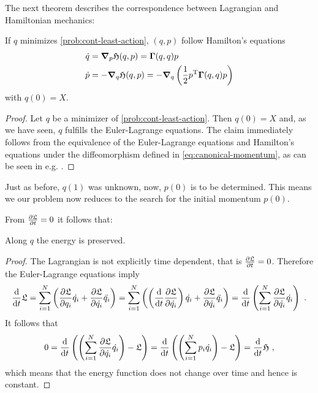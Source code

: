 The next theorem describes the correspondence between Lagrangian and Hamiltonian mechanics:
\begin{theorem}
	\label{theo:hamiltonian-dynamic}
	If $q$ minimizes \cref{prob:cont-least-action}, $(q, p)$ follow Hamilton's equations
	\begin{equation}
	\label{eq:hamiltonian-system}
		\begin{split}
			\dot{q} &= \grad_p \mathfrak{H}(q, p) = \mathbf{\Gamma}(q, q) p\\
			\dot{p} &= -\grad_q \mathfrak{H}(q, p)
			= -\grad_q \left(\frac{1}{2} p^\mathrm{T} \mathbf{\Gamma}(q, q) p\right)
		\end{split}
	\end{equation}
	with $q(0) = X$.
\end{theorem}
\begin{proof}
	Let $q$ be a minimizer of \cref{prob:cont-least-action}.
	Then $q(0) = X$ and, as we have seen, $q$ fulfills the Euler-Lagrange equations.
	The claim immediately follows from the equivalence of the Euler-Lagrange equations and Hamilton's equations under the diffeomorphism defined in \cref{eq:canonical-momentum}, as can be seen in e.g. \cite{marsden10, goldstein01}.
\end{proof}

Just as before, $q(1)$ was unknown, now, $p(0)$ is to be determined.
This means we our problem now reduces to the search for the initial momentum $p(0)$.


From $\frac{\partial \mathfrak{L}}{\partial t} = 0$ it follows that:
\begin{corollary}
	\label{cor:energy-preservation}
	Along $q$ the energy is preserved.
\end{corollary}
\begin{proof}
	The Lagrangian is not explicitly time dependent, that is $\frac{\partial \mathfrak{L}}{\partial t} = 0$.
	Therefore the Euler-Lagrange equations imply
	\begin{equation}
		\frac{\mathrm{d}}{\mathrm{d} t} \mathfrak{L} = \sum_{i=1}^{N}\left(\frac{\partial \mathfrak{L}}{\partial q_i} \dot{q_i} + \frac{\partial \mathfrak{L}}{\partial \dot{q_i}} \ddot{q_i} \right )
		=\sum_{i=1}^{N}\left( \left( \frac{\mathrm{d}}{\mathrm{d} t} \frac{\partial \mathfrak{L}}{\partial \dot{q_i}} 
		\right)\dot{q_i}+ \frac{\partial \mathfrak{L}}{\partial \dot{q_i}} \ddot{q_i}\right )
		= \frac{\mathrm{d}}{\mathrm{d} t} \left(\sum_{i=1}^{N} \frac{\partial \mathfrak{L}}{\partial \dot{q_i}} \dot{q_i}\right) \ .
	\end{equation}
	It follows that
	\begin{equation}
		0 = \frac{\mathrm{d}}{\mathrm{d} t} \left( \left(\sum_{i=1}^{N} \frac{\partial \mathfrak{L}}{\partial \dot{q_i}} \dot{q_i} \right) -  \mathfrak{L} \right) 
		= \frac{\mathrm{d}}{\mathrm{d} t} \left( \left(\sum_{i=1}^{N} p_i \dot{q_i} \right ) - \mathfrak{L} \right)
		= \frac{\mathrm{d}}{\mathrm{d} t} \mathfrak{H} \ ,
	\end{equation}
	which means that the energy function does not change over time and hence is constant.
\end{proof}

